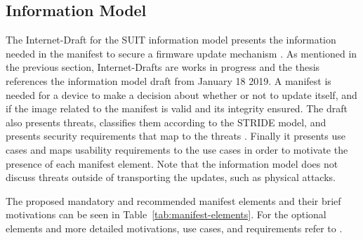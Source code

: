 \documentclass[0-thesis.tex]{subfiles}
\begin{document}
\subsection{Information Model}
\label{ssec:information-model}
The Internet-Draft for the SUIT information model presents the information needed in the
manifest to secure a firmware update mechanism \parencite{suit-information-model}. As
mentioned in the previous section, Internet-Drafts are works in progress and the thesis
references the information model draft from January 18 2019. A manifest is needed for a
device to make a decision about whether or not to update itself, and if the image related
to the manifest is valid and its integrity ensured. The draft also presents threats,
classifies them according to the STRIDE model, and presents security requirements that map
to the threats \parencite{stride}. Finally it presents use cases and maps usability
requirements to the use cases in order to motivate the presence of each manifest element.
Note that the information model does not discuss threats outside of transporting the
updates, such as physical attacks.

The proposed mandatory and recommended manifest elements and their brief motivations can
be seen in Table~\ref{tab:manifest-elements}. For the optional elements and more detailed
motivations, use cases, and requirements refer to \parencite{suit-information-model}.
\end{document}
